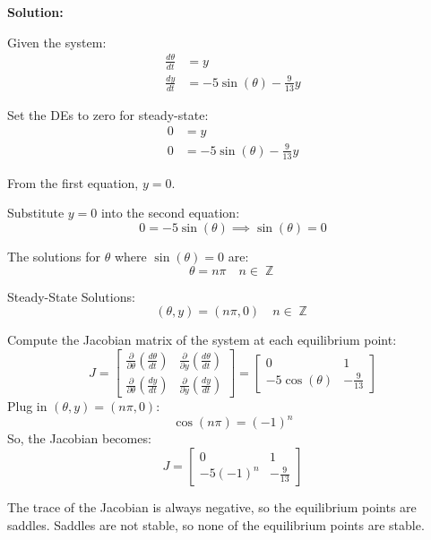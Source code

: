 \documentclass[12pt]{article}
\DeclareMathOperator{\ZZ}{\mathbb{Z}}
\newenvironment{solution}{
    \textbf{Solution:}
    
}{
    
    \vspace{2em}
}
\begin{document}
\begin{solution}
    Given the system:
    \[
    \begin{aligned}
    \frac{d\theta}{dt} &= y \\
    \frac{dy}{dt} &= -5\sin(\theta) - \frac{9}{13}y
    \end{aligned}
    \]
    
    Set the DEs to zero for steady-state:
    \[
    \begin{aligned}
    0 &= y \\
    0 &= -5\sin(\theta) - \frac{9}{13}y
    \end{aligned}
    \]
    
    From the first equation, \( y = 0 \).
    
    Substitute \( y = 0 \) into the second equation:
    \[
    0 = -5\sin(\theta) \implies \sin(\theta) = 0
    \]
    
    The solutions for \( \theta \) where \( \sin(\theta) = 0 \) are:
    \[
    \theta = n\pi \quad n \in \ZZ
    \]
    
    Steady-State Solutions:
    \[
    (\theta, y) = (n\pi, 0) \quad n \in \ZZ
    \]
    
    Compute the Jacobian matrix of the system at each equilibrium point:
    \[
    J = \begin{bmatrix}
    \frac{\partial}{\partial \theta}\left(\frac{d\theta}{dt}\right) & \frac{\partial}{\partial y}\left(\frac{d\theta}{dt}\right) \\
    \frac{\partial}{\partial \theta}\left(\frac{dy}{dt}\right) & \frac{\partial}{\partial y}\left(\frac{dy}{dt}\right)
    \end{bmatrix}
    = \begin{bmatrix}
    0 & 1 \\
    -5\cos(\theta) & -\frac{9}{13}
    \end{bmatrix}
    \]
    Plug in \( (\theta, y) = (n\pi, 0) \):
    \[
    \cos(n\pi) = (-1)^n
    \]
    So, the Jacobian becomes:
    \[
    J = \begin{bmatrix}
    0 & 1 \\
    -5(-1)^n & -\frac{9}{13}
    \end{bmatrix}
    \]
    
    The trace of the Jacobian is always negative, so the equilibrium points are saddles. Saddles are not stable, so none of the equilibrium points are stable.
\end{solution}
\end{document}
